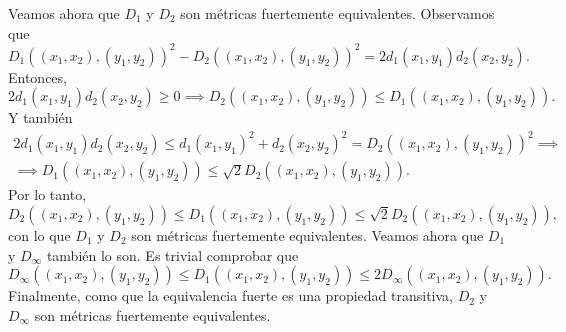 \begin{eje}
\begin{enumerate}[(a)]
\begin{enumerate}[i)]
        \end{enumerate}
    \end{enumerate}
    Veamos ahora que $D_1$ y $D_2$ son métricas fuertemente equivalentes. Observamos que
    \[
        D_1 \left( \left( x_1, x_2 \right) , \left( y_1 , y_2 \right) \right)^2-D_2 \left( \left( x_1, x_2 \right) , \left( y_1 , y_2 \right) \right)^2=2d_1\left( x_1, y_1 \right) d_2 \left( x_2, y_2 \right).
    \]
    Entonces,
    \[
        2d_1\left( x_1, y_1 \right) d_2 \left( x_2, y_2 \right) \geq 0 \implies D_2 \left( \left( x_1, x_2 \right) , \left( y_1 , y_2 \right) \right) \leq D_1 \left( \left( x_1, x_2 \right) , \left( y_1 , y_2 \right) \right).
    \]
    Y también
    \begin{gather*}
        2d_1\left( x_1, y_1 \right) d_2 \left( x_2, y_2 \right) \leq d_1\left( x_1, y_1 \right) ^2 + d_2 \left( x_2, y_2 \right) ^2 = D_2 \left( \left( x_1, x_2 \right) , \left( y_1 , y_2 \right) \right)^2 \implies \\
        \implies D_1 \left( \left( x_1, x_2 \right) , \left( y_1 , y_2 \right) \right) \leq \sqrt{2} D_2 \left( \left( x_1, x_2 \right) , \left( y_1 , y_2 \right) \right).
    \end{gather*}
    Por lo tanto,
    \[
        D_2 \left( \left( x_1, x_2 \right) , \left( y_1 , y_2 \right) \right) \leq D_1 \left( \left( x_1, x_2 \right) , \left( y_1 , y_2 \right) \right) \leq \sqrt{2} D_2 \left( \left( x_1, x_2 \right) , \left( y_1 , y_2 \right) \right),
    \]
    con lo que $D_1$ y $D_2$ son métricas fuertemente equivalentes. Veamos ahora que $D_1$ y $D_{\infty}$ también lo son. Es trivial comprobar que
    \[
        D_{\infty} \left( \left( x_1, x_2 \right) , \left( y_1 , y_2 \right) \right) \leq D_1 \left( \left( x_1, x_2 \right) , \left( y_1 , y_2 \right) \right) \leq 2 D_{\infty} \left( \left( x_1, x_2 \right) , \left( y_1 , y_2 \right) \right).
    \]
    Finalmente, como que la equivalencia fuerte es una propiedad transitiva, $D_2$ y $D_{\infty}$ son métricas fuertemente equivalentes.
    

\end{eje}
